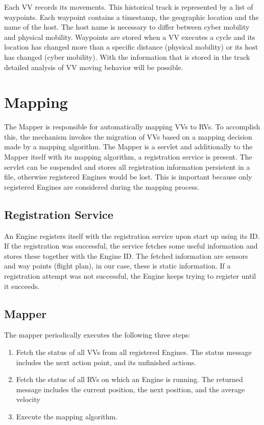 Each \ac{VV} records its movements. This historical track is represented by a list of waypoints. Each waypoint
contains a timestamp, the geographic location and the name of the host. The host name is necessary to differ between
cyber mobility and physical mobility. Waypoints are stored when a \ac{VV} executes a cycle and its location has
changed more than a specific distance (physical mobility) or its host has changed (cyber mobility). With the information
that is stored in the track detailed analysis of \ac{VV} moving behavior will be possible.



\section{Mapping}
The Mapper is responsible for automatically mapping \acp{VV} to \acp{RV}. To accomplish this, the mechanism invokes 
the migration of \acp{VV} based on a mapping decision made by a mapping algorithm. The Mapper is a servlet and
additionally to the Mapper itself with its mapping algorithm, a registration service is present. The servlet can be suspended and stores all
registration information persistent in a file, otherwise registered Engines would be lost. This is important because only registered 
Engines are considered during the mapping process.

\subsection{Registration Service}
An Engine registers itself with the registration service upon start up using its ID. If the registration was successful, the service
fetches some useful information and stores these together with the Engine ID. The fetched information are sensors and 
way points (flight plan), in our case, these is static information. If a registration attempt was not successful, the
Engine keeps trying to register until it succeeds.

\subsection{Mapper}
The mapper periodically executes the following three steps: 

\begin{enumerate}
  \item Fetch the status of all \acp{VV} from all registered Engines.
  The status message includes the next action point, and its unfinished actions.
  
  \item Fetch the status of all \acp{RV} on which an Engine is running.
  The returned message includes the current position, the next position, and the average velocity
  
  \item Execute the mapping algorithm.
\end{enumerate}

